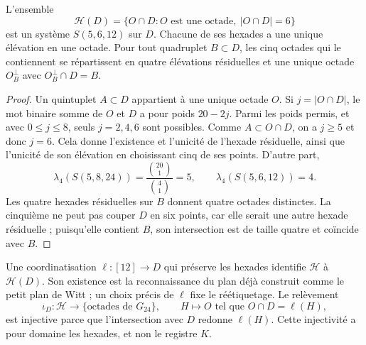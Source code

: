 \begin{proposition}
\label{exc:residuo-binario}
L'ensemble
\[
 \mathcal H(D)=
 \{O\cap D: O\text{ est une octade},\ |O\cap D|=6\}
\]
est un système $S(5,6,12)$ sur $D$. Chacune de ses hexades a une unique élévation en une octade. Pour tout quadruplet $B\subset D$, les cinq octades qui le contiennent se répartissent en quatre élévations résiduelles et une unique octade $O_B^\perp$ avec $O_B^\perp\cap D=B$.
\end{proposition}

\begin{proof}
Un quintuplet $A\subset D$ appartient à une unique octade $O$. Si
$j=|O\cap D|$, le mot binaire somme de $O$ et $D$ a pour poids
$20-2j$. Parmi les poids permis, et avec $0\leq j\leq8$, seuls
$j=2,4,6$ sont possibles. Comme $A\subset O\cap D$, on a $j\geq5$
et donc $j=6$. Cela donne l'existence et l'unicité de l'hexade
résiduelle, ainsi que l'unicité de son élévation en choisissant cinq de ses
points. D'autre part,
\[
 \lambda_4(S(5,8,24))=\frac{\binom{20}1}{\binom41}=5,
 \qquad
 \lambda_4(S(5,6,12))=4.
\]
Les quatre hexades résiduelles sur $B$ donnent quatre octades distinctes. La cinquième ne peut pas couper $D$ en six points, car elle serait une autre hexade résiduelle ; puisqu'elle contient $B$, son intersection est de taille quatre et coïncide avec $B$.
\end{proof}

Une coordinatisation $\ell:[12]\to D$ qui préserve les hexades identifie
$\mathcal H$ à $\mathcal H(D)$. Son existence est la reconnaissance
du plan déjà construit comme le petit plan de Witt ; un choix
précis de $\ell$ fixe le réétiquetage. Le relèvement
\[
 \iota_D:\mathcal H\longrightarrow
       \{\text{octades de }G_{24}\},
 \qquad H\longmapsto O\text{ tel que }O\cap D=\ell(H),
\]
est injective parce que l'intersection avec $D$ redonne $\ell(H)$. Cette injectivité a pour domaine les hexades, et non le registre $K$.


